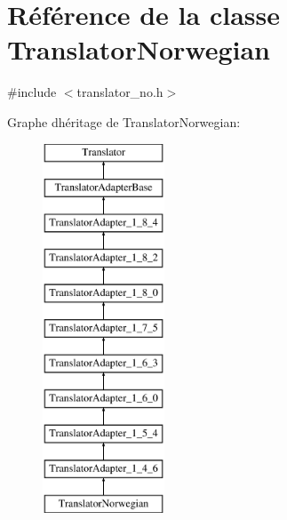 \hypertarget{class_translator_norwegian}{}\section{Référence de la classe Translator\+Norwegian}
\label{class_translator_norwegian}


{\ttfamily \#include $<$translator\+\_\+no.\+h$>$}

Graphe d\textquotesingle{}héritage de Translator\+Norwegian\+:\begin{figure}[H]
\begin{center}
\leavevmode
\includegraphics[height=11.000000cm]{class_translator_norwegian}
\end{center}
\end{figure}
